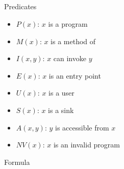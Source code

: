 \documentclass[a4paper]{article}
\begin{document}
\subsection{}
Predicates
\begin{itemize}
	\item $P(x)$: $x$ is a program
	\item $M(x)$: $x$ is a method of
	\item $I(x,y)$: $x$ can invoke
	      $y$
	\item $E(x)$: $x$ is an entry point
	\item $U(x)$: $x$ is a user
	\item $S(x)$: $x$ is a sink
	\item $A(x,y)$: $y$ is accessible from
	      $x$
	\item $NV(x)$: $x$ is an invalid program
\end{itemize}
Formula
\end{document}
